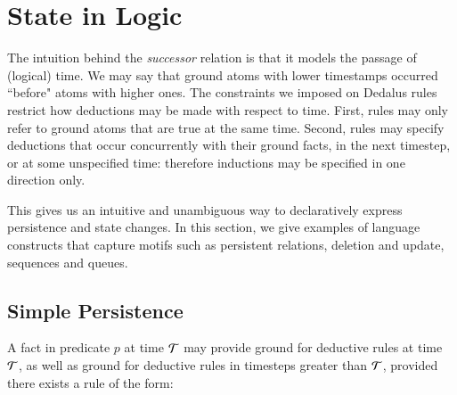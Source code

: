  \section{State in Logic}




The intuition behind the \emph{successor} relation is that it models the passage of (logical) time.  
We may say that ground atoms with lower timestamps occurred ``before" atoms with higher ones.
The constraints we imposed on Dedalus rules restrict how deductions may be made with respect to time.  First, rules may only refer to ground atoms that
are true at the same time.  Second, rules may specify deductions that occur concurrently with their ground facts, in the next timestep, or at some
unspecified time: therefore inductions may be specified in one direction only.

This gives us an intuitive and unambiguous way to declaratively express persistence and state changes.  In this section, we 
give examples of language constructs that capture motifs such as persistent relations, deletion and update, sequences
and queues.

\subsection{Simple Persistence}

A fact in predicate $p$ at time $\Tau$ may provide ground for deductive rules
at time $\Tau$, as well as ground for deductive rules in timesteps greater than $\Tau$,
provided there exists a rule of the form:

